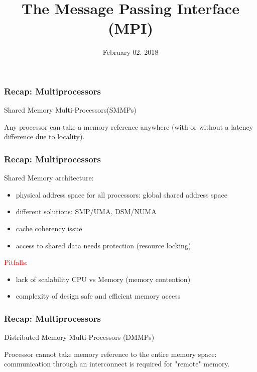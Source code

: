 

\title{The Message Passing Interface (MPI)}
\date{February 02. 2018}

\maketitle

\begin{frame}
  \frametitle{Recap: Multiprocessors}

Shared Memory Multi-Processors(SMMPs)
  \begin{center}
    
  \end{center}

Any processor can take a memory reference anywhere (with or without a latency difference due to locality).
\end{frame}

\begin{frame}
  \frametitle{Recap: Multiprocessors}
Shared Memory architecture:
\begin{itemize}
\item physical address space for all processors:  global shared address space 
\item different solutions: SMP/UMA, DSM/NUMA
\item cache coherency issue
\item access to shared data needs protection (resource locking)
\end{itemize}

\medskip
\textcolor{red}{Pitfalls}: 
\begin{itemize}
\item lack of scalability CPU vs Memory (memory contention)
\item complexity of design safe and efficient memory access
\end{itemize}
\end{frame}

\begin{frame}
  \frametitle{Recap: Multiprocessors}

Distributed Memory Multi-Processors (DMMPs)
  \begin{center}
    
  \end{center}
Processor cannot take memory reference to the entire memory space: communication through an interconnect is required for "remote" memory.
\end{frame}

